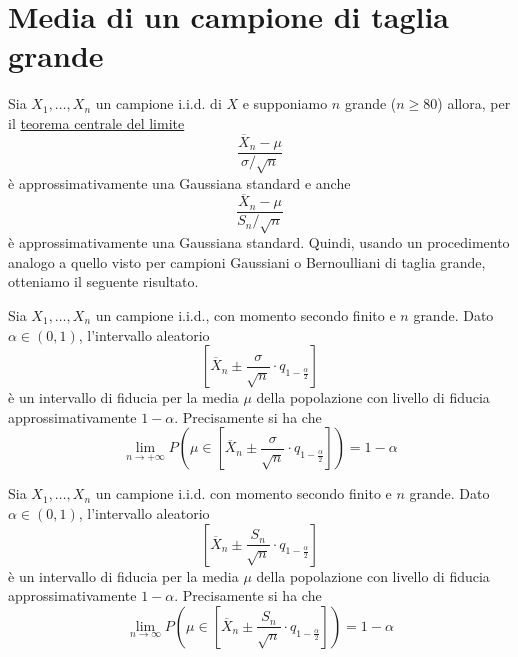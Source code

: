 \section{Media di un campione di taglia grande}
Sia $X_1, \dots, X_n$ un campione i.i.d. di $X$ e supponiamo $n$ grande ($n \geq 80$) allora, per
il \hyperref[th: tlc]{teorema centrale del limite}
\[ \frac{\overline{X}_n - \mu}{\sigma / \sqrt{n}} \]
è approssimativamente una Gaussiana standard e anche
\[ \frac{\overline{X}_n - \mu}{S_n / \sqrt{n}} \]
è approssimativamente una Gaussiana standard. Quindi, usando un procedimento analogo a quello visto
per campioni Gaussiani o Bernoulliani di taglia grande, otteniamo il seguente risultato.

\begin{proposition}
	Sia $X_1, \dots, X_n$ un campione i.i.d., con momento secondo finito e $n$ grande. Dato
	$\alpha \in (0,1)$, l'intervallo aleatorio
	\[ \left[ \overline{X}_n \pm \frac{\sigma}{\sqrt{n}} \cdot q_{1 - \frac{\alpha}{2}} \right] \]
	è un intervallo di fiducia per la media $\mu$ della popolazione con livello di fiducia
	approssimativamente $1 - \alpha$. Precisamente si ha che
	\[
		\lim_{n \to +\infty} P \left( \mu \in \left[
			\overline{X}_n \pm \frac{\sigma}{\sqrt{n}} \cdot q_{1 - \frac{\alpha}{2}}
			\right] \right) = 1 - \alpha
	\]
\end{proposition}

\begin{proposition}
	Sia $X_1, \dots, X_n$ un campione i.i.d. con momento secondo finito e $n$ grande. Dato
	$\alpha \in (0,1)$, l'intervallo aleatorio
	\[ \left[ \overline{X}_n \pm \frac{S_n}{\sqrt{n}} \cdot q_{1 - \frac{\alpha}{2}} \right] \]
	è un intervallo di fiducia per la media $\mu$ della popolazione con livello di fiducia
	approssimativamente $1-\alpha$. Precisamente si ha che
	\[
		\lim_{n \to \infty} P \left( \mu \in \left[
			\overline{X}_n \pm \frac{S_n}{\sqrt{n}} \cdot q_{1 - \frac{\alpha}{2}}
			\right] \right) = 1 - \alpha
	\]
\end{proposition}
